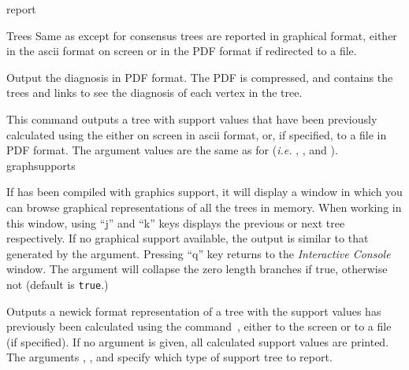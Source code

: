 \begin{command}{report}{}
\begin{arguments}
\begin{argumentgroup}{Trees}
                {Same as  except for consensus trees are
                reported in graphical format, either in the ascii format on
                screen or in the PDF format if redirected to a file.}
                {}

                {Output the diagnosis in PDF format. The PDF is compressed, and
                contains the trees and links to see the diagnosis of each vertex
                in the tree.}
                {}

                {This command outputs a tree with support values that have
                been previously calculated using the
                 either on screen
                in ascii format, or, if specified, to a file in PDF
                format. The argument values are the same as for 
                 (\emph{i.e.} ,
                , and ).} 
                {graphsupports}

                {If \poy has been compiled with graphics support, it 
                will display a window in which you can
                browse graphical representations of all the trees in memory.
                When working in this window, using ``j'' and ``k'' keys displays the
                previous or next tree respectively. If no graphical support available, the output 
                is similar to that generated by the  argument. Pressing ``q'' key 
                returns to the \emph{Interactive Console} window. The argument
                 will collapse the zero length branches if
                true, otherwise not (default is \texttt{true}.)} 
	     {}

                {Outputs a newick format representation of a tree with the
                support values has previously been calculated using the
                command~,
                either to the screen or to a file (if specified). If no argument
                is given, all calculated support values are printed. The arguments
                , , and
                 specify which type of support tree to
                report. 
                
}
\end{argumentgroup}
\end{arguments}
\end{command}
